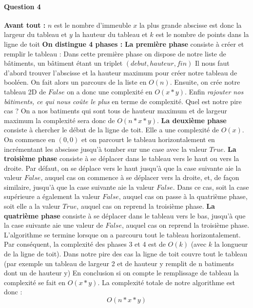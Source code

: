 \documentclass[a4paper,10pt]{article}
\begin{document}
\paragraph{Question 4}
\textbf{Avant tout :} $n$ est le nombre d'immeuble $x$ la plus grande abscisse est donc la largeur du tableau et $y$ la hauteur du tableau et $k$ est le nombre de points dans la ligne de toit\newline \newline
\textbf{On distingue 4 phases :} \newline \newline
\textbf{La première phase} consiste à créer et remplir le tableau :\newline
Dans cette première phase on dispose de notre liste de bâtiments, un bâtiment étant un triplet $(debut, hauteur, fin)$\newline
Il nous faut d'abord trouver l'abscisse et la hauteur maximum pour créer notre tableau de booléen. On fait alors un parcours de la liste en $O(n)$. 
Ensuite, on crée notre tableau 2D de $False$ on a donc une complexité en $O(x*y)$.
Enfin \emph{rajouter nos bâtiments, ce qui nous coûte le plus} en terme de complexité.
Quel est notre pire cas ? On a nos batiments qui sont tous de hauteur maximum et de largeur maximum la complexité sera donc de $O(n*x*y)$.\newline
\textbf{La deuxième phase} consiste à chercher le début de la ligne de toit. Elle a une complexité de $O(x)$. On commence en $(0,0)$ et 
on parcourt le tableau horizontalement en incrémentant les abscisse jusqu'à tomber sur une case avec la valeur $True$.\newline
\textbf{La troisième phase} consiste à se déplacer dans le tableau vers le haut ou vers la droite. Par défaut, on se déplace vers le haut jusqu'à que la case suivante aie la valeur $False$, 
auquel cas on commence à se déplacer vers la droite, et, de façon similaire, jusqu'à que la case suivante aie la valeur $False$. 
Dans ce cas, soit la case supérieure a également la valeur $False$, auquel cas on passe à la quatrième phase, soit elle a la valeur $True$, auquel cas on reprend la troisième phase.\newline
\textbf{La quatrième phase} consiste à se déplacer dans le tableau vers le bas, jusqu'à que la case suivante aie une valeur de $False$, auquel cas on reprend la troisième phase.\newline
L'algorithme se termine lorsque on a parcouru tout le tableau horizontalement.\newline
Par conséquent, la complexité des phases 3 et 4 est de $O(k)$ (avec $k$ la longueur de la ligne de toit).
Dans notre pire des cas la ligne de toit couvre tout le tableau (par exemple un tableau de largeur 2 et de hauteur y remplit de n batiments dont un de hauteur y)
En conclusion si on compte le remplissage de tableau la complexité se fait en $O(x*y)$.\newline \newline
La complexité totale de notre algorithme est donc : $$O(n*x*y)$$
\end{document}
